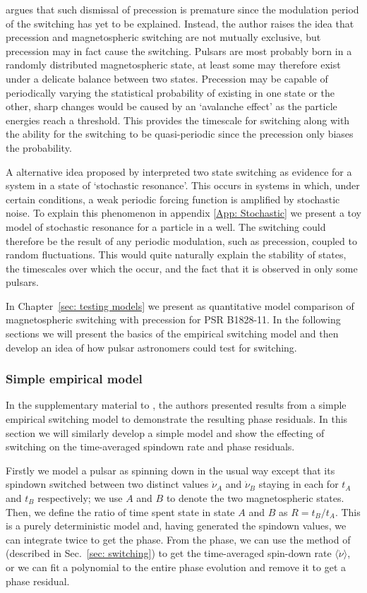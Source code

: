 \citet{Jones2012} argues that such dismissal of precession is premature since
the modulation period of the switching has yet to be explained.  Instead, the
author raises the idea that precession and magnetospheric switching are not
mutually exclusive, but precession may in fact cause the switching. Pulsars are
most probably born in a randomly distributed magnetospheric state, at least
some may therefore exist under a delicate balance between two states.
Precession may be capable of periodically varying the statistical probability
of existing in one state or the other, sharp changes would be caused by an
`avalanche effect' as the particle energies reach a threshold.  This provides
the timescale for switching along with the ability for the switching to be
quasi-periodic since the precession only biases the probability.

A alternative idea proposed by \citet{Cordes2013} interpreted two state
switching as evidence for a system in a state of `stochastic resonance'.  This
occurs in systems in which, under certain conditions, a weak periodic forcing
function is amplified by stochastic noise. To explain this phenomenon in
appendix \ref{App: Stochastic} we present a toy model of stochastic resonance
for a particle in a well. The switching could therefore be the result of any
periodic modulation, such as precession, coupled to random fluctuations. This
would quite naturally explain the stability of states, the timescales over
which the occur, and the fact that it is observed in only some pulsars.

In Chapter~\ref{sec: testing models} we present as quantitative
model comparison of magnetospheric switching with precession for PSR B1828-11.
In the following sections we will present the basics of the empirical switching
model and then develop an idea of how pulsar astronomers could test for switching.

\subsubsection{Simple empirical model}

In the supplementary material to \citet{Lyne2010}, the authors presented
results from a simple empirical switching model to demonstrate the resulting
phase residuals. In this section we will similarly develop a simple model and
show the effecting of switching on the time-averaged spindown rate and phase
residuals.

Firstly we model a pulsar as spinning down in the usual way except that its
spindown switched between two distinct values $\dot{\nu}_{A}$ and $\dot{\nu}_{B}$
staying in each for $t_A$ and $t_B$ respectively; we use
$A$ and $B$ to denote the two magnetospheric states. Then, we
define the ratio of time spent state in state $A$ and $B$ as $R =
t_{B}/t_{A}$.  This is a purely deterministic model and, having generated the
spindown values, we can integrate twice to get the phase. From the phase, we can
use the method of \citet{Lyne2010} (described in Sec.~\ref{sec: switching})
to get the time-averaged spin-down rate $\langle\dot{\nu}\rangle$, or we can
fit a polynomial to the entire phase evolution and remove it to get a phase
residual.

